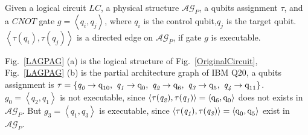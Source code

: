 \documentclass[runningheads]{llncs}
\begin{document}
Given a logical circuit $LC$, a physical structure $\mathcal{AG}_{P}$, a qubits assignment $\tau$, and a $CNOT$ gate $g=\left \langle \textit{q}_\textit{i},\textit{q}_\textit{j}\right \rangle $, where $\textit{q}_\textit{i}$ is the control qubit,$\textit{q}_\textit{j}$ is the target qubit.
$\left \langle\tau(\textit{q}_\textit{i}),\tau(\textit{q}_\textit{j})\right \rangle $ 
is a directed edge on $\mathcal{AG}_{P}$, if gate $g$ is executable.

\begin{example}
	Fig.~\ref{LAGPAG} (a) is the logical structure of Fig.~\ref{OriginalCircuit}, 
	Fig.~\ref{LAGPAG} (b) is the partial architecture graph of IBM Q20, a qubits assignment is 
	$\tau=\{\textit{q}_\textit{0}\rightarrow  \textup{q}_{\textup{10}},\ \textit{q}_\textit{1}\rightarrow \textup{q}_{\textup{0}},\ 
	\textit{q}_\textit{2}\rightarrow  \textup{q}_{\textup{6}},\ \textit{q}_\textit{3}\rightarrow  \textup{q}_{\textup{5}},\ \textit{q}_\textit{4}\rightarrow  \textup{q}_{\textup{11}}\}$.
	$g_{0}=\left \langle \textit{q}_\textit{2},\textit{q}_\textit{1}\right \rangle $ is not executable, since 
	$\left \langle \tau(\textit{q}_\textit{2}),\tau(\textit{q}_\textit{1})\right \rangle =\left \langle \textup{q}_{\textup{6}},\textup{q}_{\textup{0}}\right \rangle $ does not  exists in $\mathcal{AG}_{P}$.
	But $g_{3}=\left \langle \textit{q}_\textit{1},\textit{q}_\textit{3}\right \rangle $ is executable, since 
	$\left \langle \tau(\textit{q}_\textit{1}),\tau(\textit{q}_\textit{3})\right \rangle =\left \langle \textup{q}_{\textup{0}},\textup{q}_{\textup{5}}\right \rangle $  exist in $\mathcal{AG}_{P}$.
\end{example}
\end{document}
